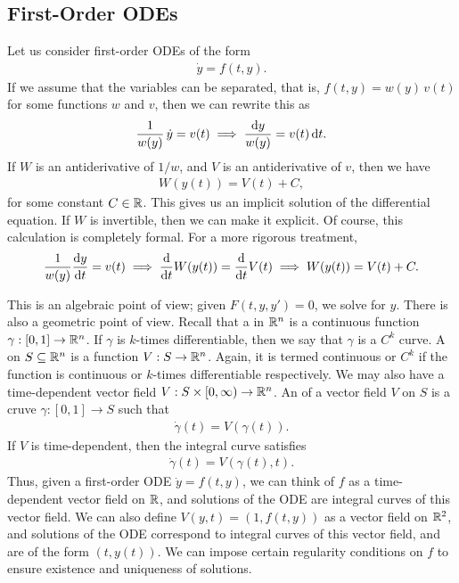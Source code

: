 \subsection{First-Order ODEs}

Let us consider first-order ODEs of the form
\begin{align}
    \dot{y} = f(t,y).
\end{align}
If we assume that the variables can be separated, that is, $f(t,y) = w(y) \, v(t)$ for some functions $w$ and $v$, then we can rewrite this as
\begin{align}
    \frac{1}{w(y)} \, \dot{y} = v(t) \implies \frac{\mathrm{d}y}{w(y)} = v(t) \, \mathrm{d}t.
\end{align}
If $W$ is an antiderivative of $1/w$, and $V$ is an antiderivative of $v$, then we have
\begin{align}
    W(y(t)) = V(t) + C,
\end{align}
for some constant $C \in \mathbb{R}$. This gives us an implicit solution of the differential equation. If $W$ is invertible, then we can make it explicit. Of course, this calculation is completely formal. For a more rigorous treatment,
\begin{align}
    \frac{1}{w(y)} \frac{\mathrm{d}y}{\mathrm{d}t} = v(t) \implies \frac{\mathrm{d}}{\mathrm{d}t} W(y(t)) = \frac{\mathrm{d}}{\mathrm{d}t} V(t) \implies W(y(t)) = V(t) + C.
\end{align}

This is an algebraic point of view; given $F(t,y,y') = 0$, we solve for $y$. There is also a geometric point of view. Recall that a  in $\mathbb{R}^{n}$ is a continuous function $\gamma : [0,1] \to \mathbb{R}^{n}$. If $\gamma$ is $k$-times differentiable, then we say that $\gamma$ is a $C^{k}$ curve. A  on $S \subseteq \mathbb{R}^{n}$ is a function $V: S \to \mathbb{R}^{n}$. Again, it is termed continuous or $C^{k}$ if the function is continuous or $k$-times differentiable respectively. We may also have a time-dependent vector field $V: S \times [0,\infty) \to \mathbb{R}^{n}$. An  of a vector field $V$ on $S$ is a cruve $\gamma:[0,1] \to S$ such that
\begin{align}
    \dot{\gamma}(t) = V(\gamma(t)).
\end{align}
If $V$ is time-dependent, then the integral curve satisfies
\begin{align}
    \dot{\gamma}(t) = V(\gamma(t),t).
\end{align}
Thus, given a first-order ODE $\dot{y} = f(t,y)$, we can think of $f$ as a time-dependent vector field on $\mathbb{R}$, and solutions of the ODE are integral curves of this vector field. We can also define $V(y,t) = (1, f(t,y))$ as a vector field on $\mathbb{R}^{2}$, and solutions of the ODE correspond to integral curves of this vector field, and are of the form $(t,y(t))$. We can impose certain regularity conditions on $f$ to ensure existence and uniqueness of solutions.

